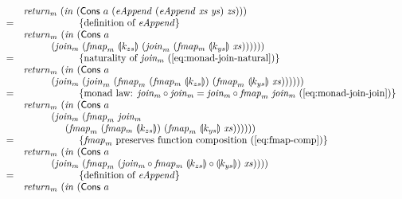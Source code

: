 \documentclass{jfp1}
\newcommand{\fold}[1]{\llparenthesis #1 \rrparenthesis}
\newcommand{\eqAnnotation}[1]{\hspace{2cm}\left\{\textrm{#1}\right\}}
\begin{document}
\begin{proof*}
\begin{displaymath}
\begin{array}{cl}
      & \mathit{return_m}~(\mathit{in}~(\mathsf{Cons}~a~(\mathit{eAppend}~(\mathit{eAppend}~\mathit{xs}~\mathit{ys})~\mathit{zs}))) \\
      =&\eqAnnotation{definition of $\mathit{eAppend}$} \\
      &\mathit{return}_m~(\mathit{in}~(\mathsf{Cons}~a~\\
      & \hspace{1cm}(\mathit{join_m}~(\mathit{fmap}_m~\fold{k_{zs}}~(\mathit{join}_m~(\mathit{fmap_m}~\fold{k_{ys}}~\mathit{xs})))))) \\
      =&\eqAnnotation{naturality of $\mathit{join_m}$ (\autoref{eq:monad-join-natural})} \\
      &\mathit{return}_m~(\mathit{in}~(\mathsf{Cons}~a~\\
      & \hspace{1cm}(\mathit{join_m}~(\mathit{join}_m~(\mathit{fmap}_m~(\mathit{fmap_m}~\fold{k_{zs}})~(\mathit{fmap}_m~\fold{k_{ys}}~\mathit{xs})))))) \\
      =&\eqAnnotation{monad law: $\mathit{join_m} \circ \mathit{join_m} = \mathit{join_m} \circ \mathit{fmap}_m~\mathit{join_m}$ (\autoref{eq:monad-join-join})} \\
      &\mathit{return}_m~(\mathit{in}~(\mathsf{Cons}~a~\\
      & \hspace{1cm}(\mathit{join_m}~(\mathit{fmap}_m~\mathit{join_m}~\\
      & \hspace{1.5cm}(\mathit{fmap}_m~(\mathit{fmap_m}~\fold{k_{zs}})~(\mathit{fmap}_m~\fold{k_{ys}}~\mathit{xs})))))) \\
      =&\eqAnnotation{$\mathit{fmap}_m$ preserves function composition (\autoref{eq:fmap-comp})} \\
      & \mathit{return}_m~(\mathit{in}~(\mathsf{Cons}~a~\\
      & \hspace{1cm}(\mathit{join_m}~(\mathit{fmap}_m~(\mathit{join_m} \circ \mathit{fmap_m}~\fold{k_{zs}} \circ \fold{k_{ys}})~\mathit{xs})))) \\
      =&\eqAnnotation{definition of $\mathit{eAppend}$} \\
      & \mathit{return}_m~(\mathit{in}~(\mathsf{Cons}~a~\\

\end{array}
\end{displaymath}
\end{proof*}
\end{document}
